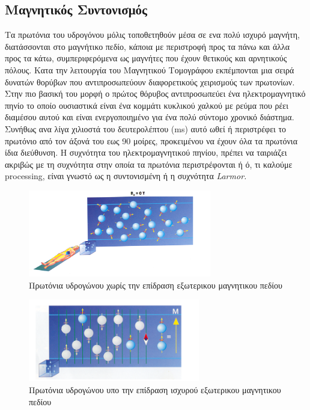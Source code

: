 \documentclass{article}
\begin{document}
\subsection{Μαγνητικός Συντονισμός}
Τα πρωτόνια του υδρογόνου μόλις τοποθετηθούν μέσα σε ενα πολύ ισχυρό μαγνήτη, διατάσσονται στο μαγνήτικο πεδίο, κάποια με περιστροφή προς τα πάνω και άλλα προς τα κάτω, συμπεριφερόμενα ως μαγνήτες που έχουν θετικούς και αρνητικούς πόλους. Κατα την λειτουργία του Μαγνητικού Τομογράφου εκπέμπονται μια σειρά δυνατών θορύβων που αντιπροσωπεύουν διαφορετικούς χειρισμούς των πρωτονίων. Στην πιο βασική του μορφή ο πρώτος θόρυβος αντιπροσωπεύει ένα ηλεκτρομαγνητικό πηνίο το οποίο ουσιαστικά είναι ένα κομμάτι κυκλικού χαλκού με ρεύμα που ρέει διαμέσου αυτού και είναι ενεργοποιημένο για ένα πολύ σύντομο χρονικό διάστημα. Συνήθως ανα λίγα χιλιοστά του δευτερολέπτου (ms) αυτό ωθεί ή περιστρέφει το πρωτόνιο από τον άξονά του εως 90 μοίρες, προκειμένου να έχουν όλα τα πρωτόνια ίδια διεύθυνση. Η συχνότητα του ηλεκτρομαγνητικού πηνίου, πρέπει να ταιριάζει ακριβώς με τη συχνότητα στην οποία τα πρωτόνια περιστρέφονται ή ό, τι καλούμε processing, είναι γνωστό ως η συντονισμένη ή η συχνότητα \textit{Larmor.}
\begin{figure}[h!]	
     \centering
  \includegraphics[width=80mm,scale=2]{mri0.png}
  \caption{Πρωτόνια υδρογώνου χωρίς την επίδραση εξωτερικου μαγνητικου πεδίου}
\end{figure}

\begin{figure}[h!]	
     \centering
  \includegraphics[width=75mm,scale=2]{mri1.png}
  \caption{Πρωτόνια υδρογώνου υπο την επίδραση ισχυρού εξωτερικου μαγνητικου πεδίου}
\end{figure}
\end{document}
